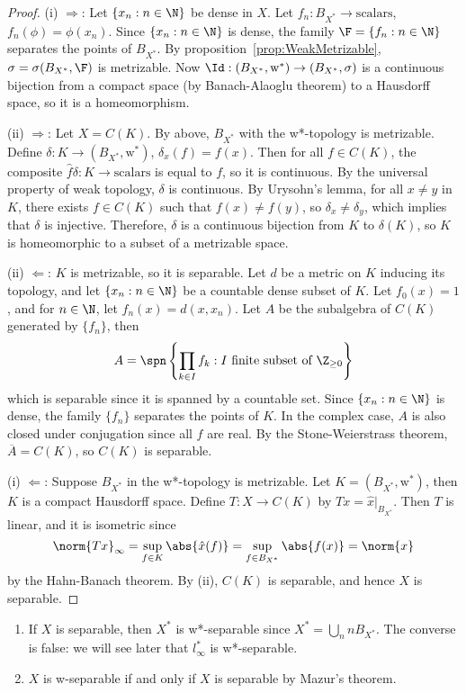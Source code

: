 \documentclass[a4paper]{article}
\begin{document}
\begin{proof}
  (i) $\Longrightarrow$: Let $\{x_n:n\in\N\}$ be dense in $X$. Let $f_n:B_{X^*}\to\mathrm{scalars}$, $f_n(\phi)=\phi(x_n)$. Since $\{x_n:n\in\N\}$ is dense, the family $\F=\{f_n:n\in\N\}$ separates the points of $B_{X^*}$. By proposition~\ref{prop:WeakMetrizable}, $\sigma=\sigma(B_{X^*},\F)$ is metrizable. Now $\Id:(B_{X^*},\mathrm{w^*})\to(B_{X^*},\sigma)$ is a continuous bijection from a compact space (by Banach-Alaoglu theorem) to a Hausdorff space, so it is a homeomorphism.

  (ii) $\Longrightarrow$: Let $X=C(K)$. By above, $B_{X^*}$ with the w*-topology is metrizable. Define $\delta:K\to (B_{X^*},\mathrm{w^*})$, $\delta_x(f)=f(x)$. Then for all $f\in C(K)$, the composite $\hat{f}\delta:K\to\mathrm{scalars}$ is equal to $f$, so it is continuous. By the universal property of weak topology, $\delta$ is continuous. By Urysohn's lemma, for all $x\not= y$ in $K$, there exists $f\in C(K)$ such that $f(x)\not= f(y)$, so $\delta_x\not=\delta_y$, which implies that $\delta$ is injective. Therefore, $\delta$ is a continuous bijection from $K$ to $\delta(K)$, so $K$ is homeomorphic to a subset of a metrizable space.

  (ii) $\Longleftarrow$: $K$ is metrizable, so it is separable. Let $d$ be a metric on $K$ inducing its topology, and let $\{x_n:n\in\N\}$ be a countable dense subset of $K$. Let $f_0(x)=1$, and for $n\in\N$, let $f_n(x)=d(x,x_n)$. Let $A$ be the subalgebra of $C(K)$ generated by $\{f_n\}$, then
	\[
	 A=\spn\left\{\prod_{k\in I}f_k:I\text{ finite subset of }\Z_{\geq 0}\right\}
	\]
	which is separable since it is spanned by a countable set. Since $\{x_n:n\in\N\}$ is dense, the family $\{f_n\}$ separates the points of $K$. In the complex case, $A$ is also closed under conjugation since all $f$ are real. By the Stone-Weierstrass theorem, $\overline{A}=C(K)$, so $C(K)$ is separable.

  (i) $\Longleftarrow$: Suppose $B_{X^*}$ in the w*-topology is metrizable. Let $K=(B_{X^*},\mathrm{w^*})$, then $K$ is a compact Hausdorff space. Define $T:X\to C(K)$ by $Tx=\hat{x}|_{B_{X^*}}$. Then $T$ is linear, and it is isometric since
  \[
    \norm{Tx}_\infty=\sup_{f\in K}\abs{\hat{x}(f)}=\sup_{f\in B_{X^*}}\abs{f(x)}=\norm{x}
  \]
  by the Hahn-Banach theorem. By (ii), $C(K)$ is separable, and hence $X$ is separable.
\end{proof}

\begin{remark}
	\begin{enumerate}[label=(\arabic*)]
		\item If $X$ is separable, then $X^*$ is w*-separable since $X^*=\bigcup_n nB_{X^*}$. The converse is false: we will see later that $l_{\infty}^*$ is w*-separable.
		\item $X$ is w-separable if and only if $X$ is separable by Mazur's theorem.
	\end{enumerate}
\end{remark}
\end{document}
